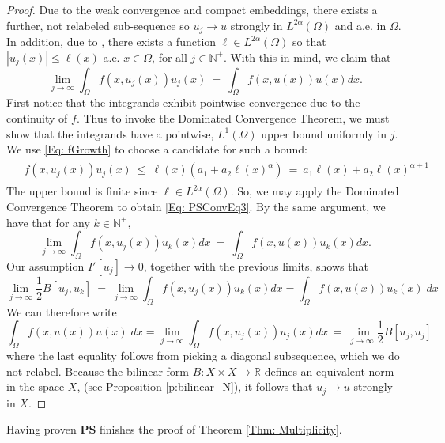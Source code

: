 \documentclass[11pt]{amsart}   	%
\theoremstyle{plain}
\numberwithin{equation}{section}
\def\al{\alpha}
\def\Om{\Omega}
\def\N{\mathbb{N}}
\def\R{\mathbb{R}}
\begin{document}
\begin{proof}
Due to the weak convergence and compact embeddings, there exists a further, not relabeled sub-sequence so $u_j \rightarrow u$ strongly in $L^{2\al}(\Om)$ and a.e. in $\Om$. In addition, due to \cite[Theorem 9]{brezis1983theorie}, there exists a function $\ell \in L^{2\al}(\Om)$ so that $|u_j(x)| \leq \ell(x)$ a.e. $x \in \Om$, for all $j \in \N^+$. With this in mind, we claim that
\begin{equation}\label{Eq: PSConvEq3}
    \lim_{j \rightarrow \infty}\int_{\Om}f(x, u_j(x))u_j(x) \ = \ \int_{\Om}f(x, u(x))u(x)dx.
\end{equation}
First notice that the integrands exhibit pointwise convergence due to the continuity of $f$. Thus to invoke the Dominated Convergence Theorem, we must show that the integrands have a pointwise, $L^1(\Om)$ upper bound uniformly in $j$. We use \eqref{Eq: fGrowth} to choose a candidate for such a bound:
\begin{eqnarray}\label{Eq: PSConvEq4}
\begin{aligned}
    &f(x, u_j(x))u_j(x) \ \leq \ \ell(x)(a_1 + a_2\ell(x)^{\al}) \ = \ a_1\ell(x) + a_2\ell(x)^{\al + 1}
    \end{aligned}
\end{eqnarray}
The upper bound is finite since $\ell \in L^{2\al}(\Om)$. So, we may apply the Dominated Convergence Theorem to obtain \eqref{Eq: PSConvEq3}. By the same argument, we have that for any $k \in \N^+$,
\begin{equation}\label{Eq: PSConvEq6}
    \lim_{j \rightarrow \infty}\int_{\Om}f(x, u_j(x))u_k(x)dx \ = \ \int_{\Om}f(x, u(x))u_k(x)dx.
\end{equation}
Our assumption $I'[u_j] \to 0$, together with the previous limits, shows that
\[\lim_{j \to \infty} \frac{1}{2} B[u_j,u_k] \ = \ \lim_{j \to \infty} \int_\Omega f(x, u_j(x))u_k(x)dx = \int_\Omega f(x,u(x))u_k(x) \;dx \]
We can therefore write
\[ \int_\Omega f(x,u(x))u(x) \;dx = \lim_{j \to \infty} \int_\Omega f(x, u_j(x))u_j(x)dx \ = \ \lim_{j \to \infty} \frac{1}{2} B[u_j,u_j]  \]
where the last equality follows from picking a diagonal subsequence, which we do not relabel.
Because the bilinear form $B: X \times X \longrightarrow \R$ defines an equivalent norm in the space $X$, (see Proposition \ref{p:bilinear_N}), it follows that $u_j \to u$ strongly in $X$.

\end{proof}

Having proven \textbf{PS} finishes the proof of Theorem \ref{Thm: Multiplicity}.
\end{document}
